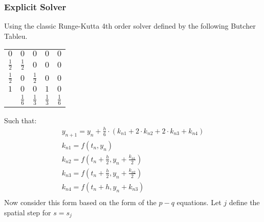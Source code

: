\documentclass{article}
\begin{document}
\subsubsection{Explicit Solver}
Using the classic Runge-Kutta 4th order solver defined by the following Butcher Tableu.
\begin{center}
  \begin{tabular}{c|c c c c}
    $0$ & $0$ & $0$ & $0$ & $0$ \\
    $\frac{1}{2}$ & $\frac{1}{2}$ & $0$ & $0$ & $0$ \\
    $\frac{1}{2}$ & $0$ & $\frac{1}{2}$ & $0$ & $0$ \\
    $1$ & $0$ & $0$ & $1$ & $0$ \\
    \hline
        & $\frac{1}{6}$ & $\frac{1}{3}$ & $\frac{1}{3}$ & $\frac{1}{6}$
  \end{tabular}
\end{center}
Such that:
\begin{align*}
  y_{n+1} = y_n + \frac{h}{6}\cdot\left(k_{n1} + 2\cdot k_{n2} + 2\cdot k_{n3} + k_{n4} \right)\\
  k_{n1} = f(t_n, y_n)\\ 
  k_{n2} = f\left(t_n + \frac{h}{2}, y_n + \frac{k_{n1}}{2}\right)\\
  k_{n3} = f\left(t_n +\frac{h}{2}, y_n+\frac{k_{n2}}{2} \right)\\
  k_{n4} = f\left(t_n + h, y_n + k_{n3} \right)\\
\end{align*}
Now consider this form based on the form of the $p-q$ equations. Let $j$ define the spatial step for $s=s_j$
\end{document}
